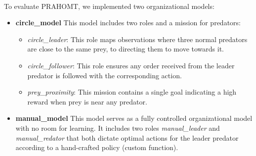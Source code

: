 \documentclass[runningheads]{llncs}
\theoremstyle{freethm}
\theoremstyle{proofoutline}
\begin{document}
\

\noindent To evaluate PRAHOMT, we implemented two organizational models:

\begin{itemize}
    \item \textbf{circle\_model} \quad This model includes two roles and a mission for predators:
          \begin{itemize}
              \item \textit{circle\_leader}: This role maps observations where three normal predators are close to the same prey, to directing them to move towards it.
              \item \textit{circle\_follower}: This role ensures any order received from the leader predator is followed with the corresponding action.
              \item \textit{prey\_proximity}: This mission contains a single goal indicating a high reward when prey is near any predator.
          \end{itemize}

    \item \textbf{manual\_model} \quad This model serves as a fully controlled organizational model with no room for learning. It includes two roles \textit{manual\_leader} and \textit{manual\_redator} that both dictate optimal actions for the leader predator according to a hand-crafted policy (custom function).
\end{itemize}

\end{document}

